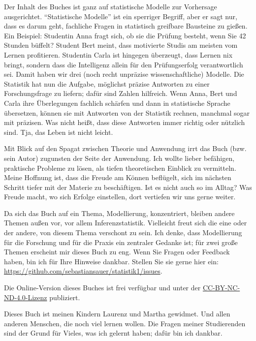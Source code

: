 \documentclass[
  letterpaper,
  twoside,
  open=any]{scrbook}
\theoremstyle{definition}
\theoremstyle{definition}
\theoremstyle{definition}
\theoremstyle{remark}
\begin{document}
Der Inhalt des Buches ist ganz auf statistische Modelle zur Vorhersage
ausgerichtet. \enquote{Statistische Modelle} ist ein sperriger Begriff,
aber er sagt nur, dass es darum geht, fachliche Fragen in statistisch
greifbare Bausteine zu gießen. Ein Beispiel: Studentin Anna fragt sich,
ob sie die Prüfung besteht, wenn Sie 42 Stunden büffelt? Student Bert
meint, dass motivierte Studis am meisten vom Lernen profitieren.
Studentin Carla ist hingegen überzeugt, dass Lernen nix bringt, sondern
dass die Intelligenz allein für den Prüfungserfolg verantwortlich sei.
Damit haben wir drei (noch recht unpräzise wissenschaftliche) Modelle.
Die Statistik hat nun die Aufgabe, möglichst präzise Antworten zu einer
Forschungsfrage zu liefern; dafür sind Zahlen hilfreich. Wenn Anna, Bert
und Carla ihre Überlegungen fachlich schärfen und dann in statistische
Sprache übersetzen, können sie mit Antworten von der Statistik rechnen,
manchmal sogar mit präzisen. Was nicht heißt, dass diese Antworten immer
richtig oder nützlich sind. Tja, das Leben ist nicht leicht.

Mit Blick auf den Spagat zwischen Theorie und Anwendung irrt das Buch
(bzw. sein Autor) zugunsten der Seite der Anwendung. Ich wollte lieber
befähigen, praktische Probleme zu lösen, als tiefen theoretischen
Einblick zu vermitteln. Meine Hoffnung ist, dass die Freude am Können
beflügelt, sich im nächsten Schritt tiefer mit der Materie zu
beschäftigen. Ist es nicht auch so im Alltag? Was Freude macht, wo sich
Erfolge einstellen, dort vertiefen wir uns gerne weiter.

Da sich das Buch auf ein Thema, Modellierung, konzentriert, bleiben
andere Themen außen vor, vor allem Inferenzstatistik. Vielleicht freut
sich die eine oder der andere, von diesem Thema verschont zu sein. Ich
denke, dass Modellierung für die Forschung und für die Praxis ein
zentraler Gedanke ist; für zwei große Themen erscheint mir dieses Buch
zu eng. Wenn Sie Fragen oder Feedback haben, bin ich für Ihre Hinweise
dankbar. Stellen Sie sie gerne hier ein:
\url{https://github.com/sebastiansauer/statistik1/issues}.

Die Online-Version dieses Buches ist frei verfügbar und unter der
\href{https://creativecommons.org/licenses/by-nc-nd/4.0/deed.de}{CC-BY-NC-ND-4.0-Lizenz}
publiziert.

Dieses Buch ist meinen Kindern Laurenz und Martha gewidmet. Und allen
anderen Menschen, die noch viel lernen wollen. Die Fragen meiner
Studierenden sind der Grund für Vieles, was ich gelernt haben; dafür bin
ich dankbar.
\end{document}
